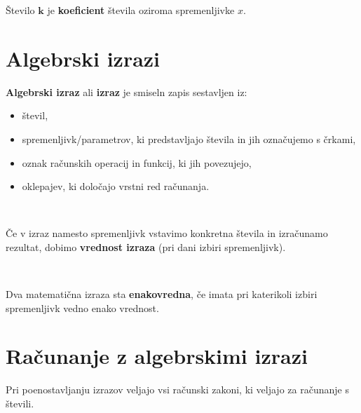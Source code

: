     
            
                Število $\mathbf{k}$ je \textbf{koeficient} števila oziroma spremenljivke $x$.
            
        
    
        \section{Algebrski izrazi}
    
        
    
            
                \textbf{Algebrski izraz} ali \textbf{izraz} je smiseln zapis sestavljen iz:
                \begin{itemize}
                    \item števil,
                    \item spremenljivk/parametrov, ki predstavljajo števila in jih označujemo s črkami,
                    \item oznak računskih operacij in funkcij, ki jih povezujejo,
                    \item oklepajev, ki določajo vrstni red računanja. 
                \end{itemize}
            ~
    
            
                Če v izraz namesto spremenljivk vstavimo konkretna števila in izračunamo rezultat, dobimo \textbf{vrednost izraza} (pri dani izbiri spremenljivk).
    
            ~
    
            
                Dva matematična izraza sta \textbf{enakovredna}, če imata pri katerikoli izbiri spremenljivk vedno enako vrednost.
    
            
        
    
        
        \section{Računanje z algebrskimi izrazi}
    
    
    
        
            
                Pri poenostavljanju izrazov veljajo vsi računski zakoni, ki veljajo za računanje s števili.
            
